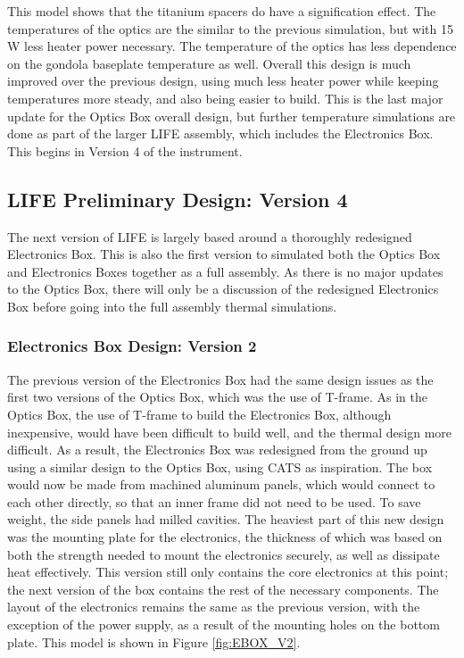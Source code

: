 This model shows that the titanium spacers do have a signification effect. The temperatures of the optics are the similar to the previous simulation, but with 15\,W less heater power necessary. The temperature of the optics has less dependence on the gondola baseplate temperature as well. Overall this design is much improved over the previous design, using much less heater power while keeping temperatures more steady, and also being easier to build. This is the last major update for the Optics Box overall design, but further temperature simulations are done as part of the larger LIFE assembly, which includes the Electronics Box. This begins in Version 4 of the instrument.

\subsection{LIFE Preliminary Design: Version 4} 
The next version of LIFE is largely based around a thoroughly redesigned Electronics Box. This is also the first version to simulated both the Optics Box and Electronics Boxes together as a full assembly. As there is no major updates to the Optics Box, there will only be a discussion of the redesigned Electronics Box before going into the full assembly thermal simulations.

\subsubsection{Electronics Box Design: Version 2}
The previous version of the Electronics Box had the same design issues as the first two versions of the Optics Box, which was the use of T-frame. As in the Optics Box, the use of T-frame to build the Electronics Box, although inexpensive, would have been difficult to build well, and the thermal design more difficult. As a result, the Electronics Box was redesigned from the ground up using a similar design to the Optics Box, using CATS as inspiration. The box would now be made from machined aluminum panels, which would connect to each other directly, so that an inner frame did not need to be used. To save weight, the side panels had milled cavities. The heaviest part of this new design was the mounting plate for the electronics, the thickness of which was based on both the strength needed to mount the electronics securely, as well as dissipate heat effectively. This version still only contains the core electronics at this point; the next version of the box contains the rest of the necessary components. The layout of the electronics remains the same as the previous version, with the exception of the power supply, as a result of the mounting holes on the bottom plate. This model is shown in Figure \ref{fig:EBOX_V2}.

